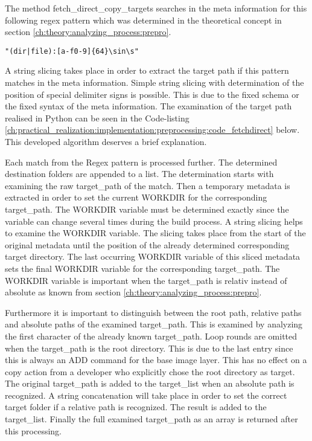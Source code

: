 The method fetch\_direct\_copy\_targets searches in the meta information for this following regex pattern which was determined in the theoretical concept in section \ref{ch:theory:analyzing_process:prepro}.
\begin{lstlisting}
"(dir|file):[a-f0-9]{64}\sin\s"
\end{lstlisting}
A string slicing takes place in order to extract the target path if this pattern matches in the meta information. 
Simple string slicing with determination of the position of special delimiter signs is possible. 
This is due to the fixed schema or the fixed syntax of the meta information.
The examination of the target path realised in Python can be seen in the Code-listing \ref{ch:practical_realization:implementation:preprocessing:code_fetchdirect} below.
This developed algorithm deserves a brief explanation.

Each match from the Regex pattern is processed further. 
The determined destination folders are appended to a list. 
The determination starts with examining the raw target\_path of the match. 
Then a temporary metadata is extracted in order to set the current WORKDIR for the corresponding target\_path. 
The WORKDIR variable must be determined exactly since the variable can change several times during the build process. 
A string slicing helps to examine the WORKDIR variable. 
The slicing takes place from the start of the original metadata until the position of the already determined corresponding target directory. 
The last occurring WORKDIR variable of this sliced metadata sets the final WORKDIR variable for the corresponding target\_path. 
The WORKDIR variable is important when the target\_path is relativ instead of absolute as known from section \ref{ch:theory:analyzing_process:prepro}.

Furthermore it is important to distinguish between the root path, relative paths and absolute paths of the examined target\_path. 
This is examined by analyzing the first character of the already known target\_path. 
Loop rounds are omitted when the target\_path is the root directory. 
This is due to the last entry since this is always an ADD command for the base image layer. 
This has no effect on a copy action from a developer who explicitly chose the root directory as target.
The original target\_path is added to the target\_list when an absolute path is recognized. 
A string concatenation will take place in order to set the correct target folder if a relative path is recognized. The result is added to the target\_list.
Finally the full examined target\_path as an array is returned after this processing.

